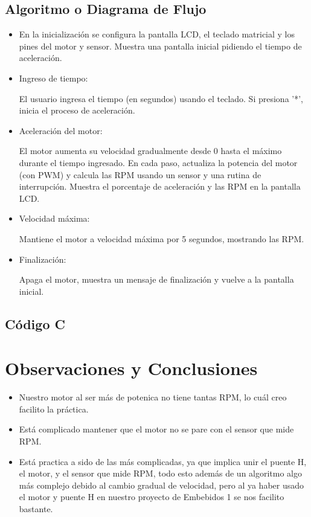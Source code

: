 \documentclass[11pt]{scrartcl}
\begin{document}
\subsection{Algoritmo o Diagrama de Flujo}

\begin{itemize}
\item En la inicialización se configura la pantalla LCD, el teclado matricial y los pines del motor y sensor.
Muestra una pantalla inicial pidiendo el tiempo de aceleración.


\item Ingreso de tiempo:

El usuario ingresa el tiempo (en segundos) usando el teclado.
Si presiona '*', inicia el proceso de aceleración.


\item Aceleración del motor:

El motor aumenta su velocidad gradualmente desde 0 hasta el máximo durante el tiempo ingresado.
En cada paso, actualiza la potencia del motor (con PWM) y calcula las RPM usando un sensor y una rutina de interrupción.
Muestra el porcentaje de aceleración y las RPM en la pantalla LCD.

\item Velocidad máxima:

Mantiene el motor a velocidad máxima por 5 segundos, mostrando las RPM.

\item Finalización:

Apaga el motor, muestra un mensaje de finalización y vuelve a la pantalla inicial.

\end{itemize}

\subsection{ Código C}




\section{Observaciones y Conclusiones}

\begin{itemize}
    \item Nuestro motor al ser más de potenica no tiene tantas RPM, lo cuál creo facilito la práctica.
    \item Está complicado mantener que el motor no se pare con el sensor que mide RPM.
    \item Está practica a sido de las más complicadas, ya que implica unir el puente H, el motor, y el sensor que mide RPM, todo esto además de un algoritmo algo más 
    complejo debido al cambio gradual de velocidad, pero al ya haber usado el motor y puente H en nuestro proyecto de Embebidos 1 se nos facilito bastante. 
\end{itemize}
  

    
\end{document}
